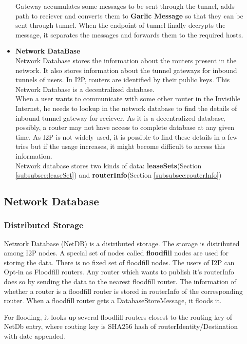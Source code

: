 \documentclass{main}
\begin{document}
\begin{itemize}
		Gateway accumulates some messages to be sent through the tunnel, adds path to reciever and
		converts them to \textbf{Garlic Message} so that they can be sent through tunnel.
		When the endpoint of tunnel finally decrypts the message, it separates the messages and forwards them 
		to the required hosts.
	\item \textbf{Network DataBase} \\
		Network Database stores the information about the routers present in the network. It also stores information
		about the tunnel gateways for inbound tunnels of users. In I2P, routers are identified by their public keys.
		This Network Database is a decentralized database. \\
		When a user wants to communicate with some other router in the Invisible Internet, he needs to lookup in the
		network database to find the details of inbound tunnel gateway for reciever. As it is a decentralized database,
		possibly, a router may not have access to complete database at any given time. As I2P is not widely used, it 
		is possible to find these details in a few tries but if the usage increases, it might become difficult to access
		this information.\\
		Network database stores two kinds of data: \textbf{leaseSets}(Section \ref{subsubsec:leaseSet}) and \textbf{routerInfo}(Section \ref{subsubsec:routerInfo})

\end{itemize}
\subsection{Network Database}

\subsubsection{Distributed Storage}
Network Database (NetDB) is a distributed storage. The storage is distributed among I2P nodes.
A special set of nodes called \textbf{floodfill} nodes are used for storing the data. There is no fixed
set of floodfill nodes. The users of I2P can Opt-in as Floodfill routers. Any router which wants to 
publish it's routerInfo does so by sending the data to the nearest floodfill router. The information of
whether a router is a floodfill router is stored in routerInfo of the corresponding router. When a floodfill
router gets a DatabaseStoreMessage, it floods it.

For flooding, it looks up several floodfill routers closest to the routing key of NetDb entry, where routing
key is SHA256 hash of routerIdentity/Destination with date appended.
\end{document}
